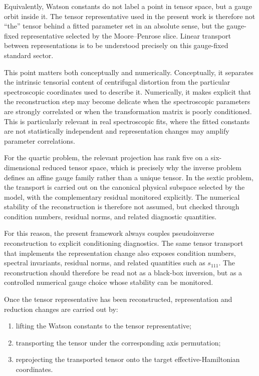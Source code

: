 \documentclass[aip,jcp,reprint,floatfix]{revtex4-2}
\begin{document}
Equivalently, Watson constants do not label a point in tensor space,
but a gauge orbit inside it. The tensor representative used in the
present work is therefore not ``the'' tensor behind a fitted parameter
set in an absolute sense, but the gauge-fixed representative selected
by the Moore--Penrose slice. Linear transport between representations
is to be understood precisely on this gauge-fixed standard sector.

This point matters both conceptually and numerically. Conceptually, it
separates the intrinsic tensorial content of centrifugal distortion
from the particular spectroscopic coordinates used to describe it.
Numerically, it makes explicit that the reconstruction step may become
delicate when the spectroscopic parameters are strongly correlated or
when the transformation matrix is poorly conditioned. This is
particularly relevant in real spectroscopic fits, where the fitted
constants are not statistically independent and representation changes
may amplify parameter correlations.

For the quartic problem, the relevant projection has rank five on a
six-dimensional reduced tensor space, which is precisely why the
inverse problem defines an affine gauge family rather than a unique
tensor. In the sextic problem, the transport is carried out on the
canonical physical subspace selected by the model, with the
complementary residual monitored explicitly. The numerical stability
of the reconstruction is therefore not assumed, but checked through
condition numbers, residual norms, and related diagnostic quantities.

For this reason, the present framework always couples pseudoinverse
reconstruction to explicit conditioning diagnostics. The same tensor
transport that implements the representation change also exposes
condition numbers, spectral invariants, residual norms, and related
quantities such as $s_{111}$. The reconstruction should therefore be
read not as a black-box inversion, but as a controlled numerical gauge
choice whose stability can be monitored.

Once the tensor representative has been reconstructed, representation
and reduction changes are carried out by:
\begin{enumerate}
\item lifting the Watson constants to the tensor representative;
\item transporting the tensor under the corresponding axis permutation;
\item reprojecting the transported tensor onto the target effective-Hamiltonian
coordinates.
\end{enumerate}
\end{document}
